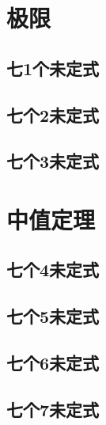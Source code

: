 \documentclass[no-math]{course}
\begin{document}
	\raggedbottom
	\abovedisplayshortskip=4pt
	\belowdisplayshortskip=4pt
	\abovedisplayskip=4pt
	\belowdisplayskip=4pt
	\frontmatter
		\tableofcontents
	\mainmatter
	\chapter{极限}
\section{七1个未定式}
\section{七个2未定式}
\section{七个3未定式}
	\chapter{中值定理}
\section{七个4未定式}
\section{七个5未定式}
\section{七个6未定式}
\section{七个7未定式}
\end{document}
